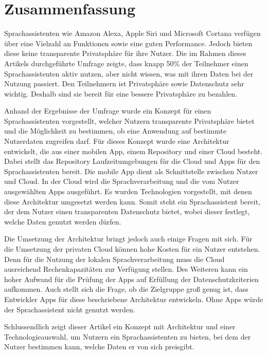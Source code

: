 \section{Zusammenfassung}
Sprachassistenten wie Amazon Alexa, Apple Siri und Microsoft Cortana verfügen über eine Vielzahl an Funktionen sowie eine guten Performance. Jedoch bieten diese keine transparente Privatsphäre für ihre Nutzer. Die im Rahmen dieses Artikels durchgeführte Umfrage zeigte, dass knapp 50\% der Teilnehmer einen Sprachassistenten aktiv nutzen, aber nicht wissen, was mit ihren Daten bei der Nutzung passiert. Den Teilnehmern ist Privatsphäre sowie Datenschutz sehr wichtig. Deshalb sind sie bereit für eine bessere Privatsphäre zu bezahlen. 

Anhand der Ergebnisse der Umfrage wurde ein Konzept für einen Sprachassistenten vorgestellt, welcher Nutzern transparente Privatsphäre bietet und die Möglichkeit zu bestimmen, ob eine Anwendung auf bestimmte Nutzerdaten zugreifen darf. Für dieses Konzept wurde eine Architektur entwickelt, die aus einer mobilen App, einem Repository und einer Cloud besteht. Dabei stellt das Repository Laufzeitumgebungen für die Cloud und Apps für den Sprachassistenten bereit. Die mobile App dient als Schnittstelle zwischen Nutzer und Cloud. In der Cloud wird die Sprachverarbeitung und die vom Nutzer ausgewählten Apps ausgeführt. Es wurden Technologien vorgestellt, mit denen diese Architektur umgesetzt werden kann. Somit steht ein Sprachassistent bereit, der dem Nutzer einen transparenten Datenschutz bietet, wobei dieser festlegt, welche Daten genutzt werden dürfen. 

Die Umsetzung der Architektur bringt jedoch auch einige Fragen mit sich. Für die Umsetzung der privaten Cloud können hohe Kosten für ein Nutzer entstehen. Denn für die Nutzung der lokalen Sprachverarbeitung muss die Cloud ausreichend Rechenkapazitäten zur Verfügung stellen. Des Weiteren kann ein hoher Aufwand für die Prüfung der Apps auf Erfüllung der Datenschutzkriterien aufkommen. Auch stellt sich die Frage, ob die Zielgruppe groß genug ist, dass Entwickler Apps für diese beschriebene Architektur entwickeln. Ohne Apps würde der Sprachassistent nicht genutzt werden.

Schlussendlich zeigt dieser Artikel ein Konzept mit Architektur und einer Technologieauswahl, um Nutzern ein Sprachassistenten zu bieten, bei dem der Nutzer bestimmen kann, welche Daten er von sich preisgibt. 